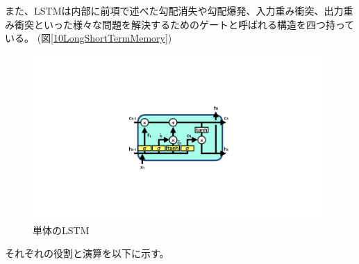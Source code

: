 また、LSTMは内部に前項で述べた勾配消失や勾配爆発、入力重み衝突、出力重み衝突といった様々な問題を解決するためのゲートと呼ばれる構造を四つ持っている。 (図\ref{10LongShortTermMemory})

\begin{figure}[h]
 \centering
 \includegraphics[trim = 0 300 0 300, width=1.0\textwidth, clip]{Figure/2DeepLearning/11LSTM.png}
 \caption{単体のLSTM}
 \label{11LSTM}
\end{figure}

それぞれの役割と演算を以下に示す。

